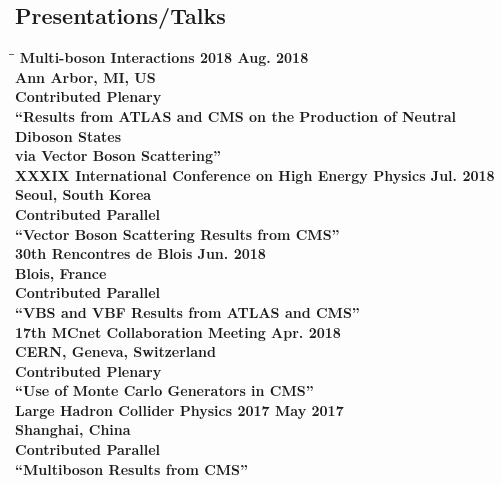 \documentclass[10pt]{res} %
\begin{document}
\begin{resume}
\section{Presentations/Talks}
\vspace{-0.1in}

\begin{tabbing}
\hspace{2.3in}\= \hspace{2.6in}\= \kill %
\bf{Multi-boson Interactions 2018} 		 \> \>	    Aug. 2018 \\
Ann Arbor, MI, US \\
Contributed Plenary \\ 
``Results from ATLAS and CMS on the Production of Neutral Diboson States \\via Vector Boson Scattering'' \\
\bf{XXXIX International Conference on High Energy Physics} 		 \> \>	    Jul. 2018 \\
Seoul, South Korea\\
Contributed Parallel\\ 
``Vector Boson Scattering Results from CMS'' \\
\bf{30th Rencontres de Blois} 		 \> \>	    Jun. 2018 \\
Blois, France\\
Contributed Parallel\\ 
``VBS and VBF Results from ATLAS and CMS'' \\
\bf{17th MCnet Collaboration Meeting} 		 \> \>	    Apr. 2018 \\
CERN, Geneva, Switzerland \\
Contributed Plenary\\ 
``Use of Monte Carlo Generators in CMS'' \\
\bf{Large Hadron Collider Physics 2017} 		 \> \>	    May 2017 \\
Shanghai, China \\
Contributed Parallel \\ 
``Multiboson Results from CMS'' \\


\end{tabbing}
\end{resume}
\end{document}
